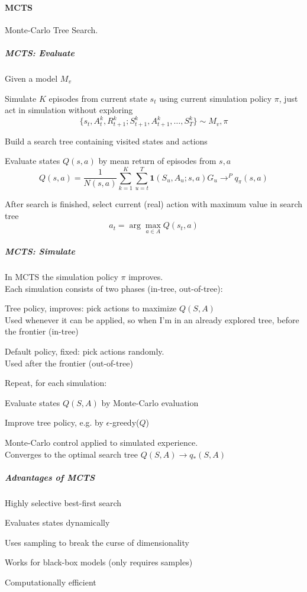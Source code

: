\documentclass[10pt]{report}
\begin{document}
\paragraph{MCTS} Monte-Carlo Tree Search.
\subparagraph{MCTS: Evaluate}
Given a model $M_v$
\begin{list}{}{}
	\item Simulate $K$ episodes from current state $s_t$ using current simulation policy $\pi$, just act in simulation without exploring
	$$\{s_t,A_t^k,R_{t+1}^k;S_{t+1}^k,A_{t+1}^k,\ldots,S_T^k\}\sim M_v,\pi$$
	\item Build a search tree containing visited states and actions
	\item Evaluate states $Q(s,a)$ by mean return of episodes from $s,a$
	$$Q(s,a)=\frac{1}{N(s,a)}\sum_{k=1}^K\sum_{u=t}^T\mathbf{1}(S_u,A_u;s,a) G_u\rightarrow^P q_\pi(s,a)$$
\end{list}
After search is finished, select current (real) action with maximum value in search tree
$$a_t=\arg\max_{a\in A} Q(s_t,a)$$
\subparagraph{MCTS: Simulate} In MCTS the simulation policy $\pi$ improves.\\
Each simulation consists of two phases (in-tree, out-of-tree):
\begin{list}{}{}
	\item Tree policy, improves: pick actions to maximize $Q(S,A)$\\
	Used whenever it can be applied, so when I'm in an already explored tree, before the frontier (in-tree)
	\item Default policy, fixed: pick actions randomly.\\
	Used after the frontier (out-of-tree)
\end{list}
Repeat, for each simulation:
\begin{list}{}{}
	\item Evaluate states $Q(S,A)$ by Monte-Carlo evaluation
	\item Improve tree policy, e.g. by $\epsilon$-greedy($Q$)
\end{list}
Monte-Carlo control applied to simulated experience.\\
Converges to the optimal search tree $Q(S,A)\rightarrow q_*(S,A)$
\subparagraph{Advantages of MCTS}
\begin{list}{}{}
	\item Highly selective best-first search
	\item Evaluates states dynamically
	\item Uses sampling to break the curse of dimensionality
	\item Works for black-box models (only requires samples)
	\item Computationally efficient
\end{list}
\end{document}
